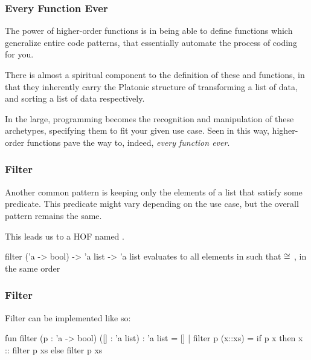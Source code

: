 \documentclass[aspectratio=169, handout]{beamer}
\begin{document}
\begin{frame}[fragile]
  \frametitle{Every Function Ever}

  The power of higher-order functions is in being able to define functions
  which generalize entire code patterns, that essentially automate the process
  of coding for you.

  \pause
  \vspace{\fill}

  There is almost a spiritual component to the definition of these
   and  functions, in that they inherently carry the
  Platonic structure of transforming a list of data, and sorting a list of
  data respectively.

  \pause
  \vspace{\fill}

  In the large, programming becomes the recognition and manipulation of these
  archetypes, specifying them to fit your given use case. Seen in this way,
  higher-order functions pave the way to, indeed, \textit{every function ever}.
\end{frame}


\begin{frame}[fragile]
  \frametitle{Filter}

  Another common pattern is keeping only the elements of a list that satisfy
  some predicate. This predicate might vary depending on the use case, but
  the overall pattern remains the same.

  \pause
  \vspace{\fill}

  This leads us to a HOF named .

  \pause
  \vspace{\fill}

  \spec
    {filter}
    {('a -> bool) -> 'a list -> 'a list}
    {}
    { evaluates to all elements  in 
    such that  $\cong$ , in the same order}
\end{frame}

\begin{frame}[fragile]
  \frametitle{Filter}

  Filter can be implemented like so:

  \pause
  \begin{codeblock}
    fun filter (p : 'a -> bool) ([] : 'a list) : 'a list = []
      | filter p (x::xs) =
          if p x then
            x :: filter p xs
          else
            filter p xs
  \end{codeblock}
\end{frame}
\end{document}
